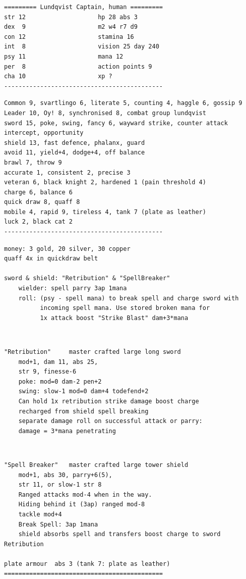 \goodbreak \small \begin{samepage} \begin{verbatim}
========= Lundqvist Captain, human =========
str 12                    hp 28 abs 3
dex  9                    m2 w4 r7 d9
con 12                    stamina 16
int  8                    vision 25 day 240
psy 11                    mana 12
per  8                    action points 9
cha 10                    xp ?
--------------------------------------------
\end{verbatim} \end{samepage} \goodbreak \begin{samepage} \begin{verbatim}
Common 9, svartlingo 6, literate 5, counting 4, haggle 6, gossip 9
Leader 10, Oy! 8, synchronised 8, combat group lundqvist
sword 15, poke, swing, fancy 6, wayward strike, counter attack
intercept, opportunity
shield 13, fast defence, phalanx, guard
avoid 11, yield+4, dodge+4, off balance
brawl 7, throw 9
accurate 1, consistent 2, precise 3
veteran 6, black knight 2, hardened 1 (pain threshold 4)
charge 6, balance 6
quick draw 8, quaff 8
mobile 4, rapid 9, tireless 4, tank 7 (plate as leather)
luck 2, black cat 2
--------------------------------------------
\end{verbatim} \end{samepage} \goodbreak \begin{samepage} \begin{verbatim}
money: 3 gold, 20 silver, 30 copper
quaff 4x in quickdraw belt

sword & shield: "Retribution" & "SpellBreaker"
    wielder: spell parry 3ap 1mana
    roll: (psy - spell mana) to break spell and charge sword with
          incoming spell mana. Use stored broken mana for
          1x attack boost "Strike Blast" dam+3*mana
\end{verbatim} \end{samepage}   \   \goodbreak \begin{samepage} \begin{verbatim}
"Retribution"     master crafted large long sword
    mod+1, dam 11, abs 25,
    str 9, finesse-6
    poke: mod=0 dam-2 pen+2
    swing: slow-1 mod=0 dam+4 todefend+2
    Can hold 1x retribution strike damage boost charge
    recharged from shield spell breaking
    separate damage roll on successful attack or parry:
    damage = 3*mana penetrating
\end{verbatim} \end{samepage}   \   \goodbreak \begin{samepage} \begin{verbatim}
"Spell Breaker"   master crafted large tower shield
    mod+1, abs 30, parry+6(5),
    str 11, or slow-1 str 8
    Ranged attacks mod-4 when in the way.
    Hiding behind it (3ap) ranged mod-8
    tackle mod+4
    Break Spell: 3ap 1mana
    shield absorbs spell and transfers boost charge to sword Retribution

plate armour  abs 3 (tank 7: plate as leather)
============================================
\end{verbatim} \end{samepage} \normalsize

